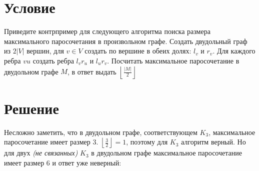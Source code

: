 

\cfoot{}



\section*{Условие}

Приведите контрпример для следующего алгоритма поиска размера максимального паросочетания в произвольном графе. Создать двудольный граф из \(2|V|\) вершин, для \(v\in V\) создать по вершине в обеих долях: \(l_v\) и \(r_v\).
Для каждого ребра \(vu\) создать ребра \(l_v r_u\) и \(l_u r_v\). Посчитать максимальное паросочетание в двудольном графе \(M\), в ответ выдать \(\left\lfloor \frac{|M|}{2} \right\rfloor\)

\section*{Решение}

Несложно заметить, что в двудольном графе, соответствующем \(K_3\), максимальное паросочетание имеет размер \(3\). \(\left\lfloor \frac{3}{2} \right\rfloor = 1\), поэтому для \(K_3\) алгоритм верный. Но для двух \textit{(не связанных)} \(K_3\) в двудольном графе максимальное паросочетание имеет размер \(6\) и ответ уже неверный:

